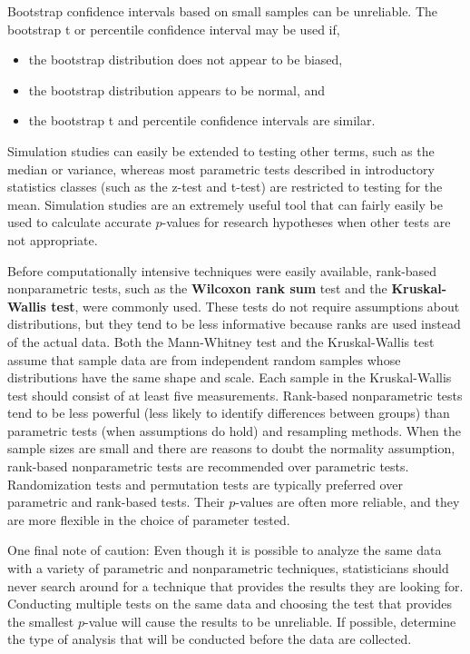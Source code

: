\documentclass[
]{report}
\providecommand{\tightlist}{%
  \setlength{\itemsep}{0pt}\setlength{\parskip}{0pt}}
\begin{document}
Bootstrap confidence intervals based on small samples can be unreliable. The bootstrap t or percentile confidence interval may be used if,

\begin{itemize}
\tightlist
\item
  the bootstrap distribution does not appear to be biased,
\item
  the bootstrap distribution appears to be normal, and
\item
  the bootstrap t and percentile confidence intervals are similar.
\end{itemize}

Simulation studies can easily be extended to testing other terms, such as the median or variance, whereas most parametric tests described in introductory statistics classes (such as the z-test and t-test) are restricted to testing for the mean. Simulation studies are an extremely useful tool that can fairly easily be used to calculate accurate \(p\)-values for research hypotheses when other tests are not appropriate.

Before computationally intensive techniques were easily available, rank-based nonparametric tests, such as the \textbf{Wilcoxon rank sum} test and the \textbf{Kruskal-Wallis test}, were commonly used. These tests do not require assumptions about distributions, but they tend to be less informative because ranks are used instead of the actual data. Both the Mann-Whitney test and the Kruskal-Wallis test assume that sample data are from independent random samples whose distributions have the same shape and scale. Each sample in the Kruskal-Wallis test should consist of at least five measurements. Rank-based nonparametric tests tend to be
less powerful (less likely to identify differences between groups) than parametric tests (when assumptions do hold) and resampling methods. When the sample sizes are small and there are reasons to doubt the normality assumption, rank-based nonparametric tests are recommended over parametric tests. Randomization tests and
permutation tests are typically preferred over parametric and rank-based tests. Their \(p\)-values are often more reliable, and they are more flexible in the choice of parameter tested.

One final note of caution: Even though it is possible to analyze the same data with a variety of parametric and nonparametric techniques, statisticians should never search around for a technique that provides the results they are looking for. Conducting multiple tests on the same data and choosing the test that provides
the smallest \(p\)-value will cause the results to be unreliable. If possible, determine the type of analysis that will be conducted before the data are collected.
\end{document}
